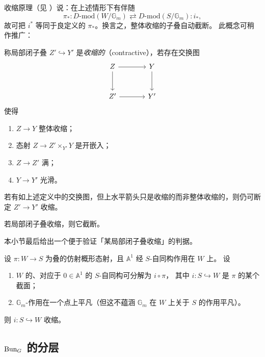 收缩原理（见 \cite[命题 5.3.2]{DG15}）说：在上述情形下有伴随
\[
\pi_*\colon D\text{-}\mathrm{mod}(W/\mathbb{G}_m)\rightleftarrows D\text{-}\mathrm{mod}(S/\mathbb{G}_m):i_*,
\]
故可把 $i^{*}$ 等同于良定义的 $\pi_*$。换言之，整体收缩的子叠自动截断。
此概念可稍作推广：

\begin{definition}[{[DG15, 5.2.1]}]
\label{def:contractive}
称局部闭子叠 $Z'\hookrightarrow Y'$ 是\emph{收缩的}（contractive），若存在交换图
\[
\begin{tikzcd}[column sep=large,row sep=large]
Z \arrow[r] \arrow[d] & Y \arrow[d]\\
Z' \arrow[r] & Y'
\end{tikzcd}
\]
使得
\begin{enumerate}
\item[(i)] $Z\to Y$ 整体收缩；
\item[(ii)] 态射 $Z\to Z'\times_{Y'}Y$ 是开嵌入；
\item[(iii)] $Z\to Z'$ 满；
\item[(iv)] $Y\to Y'$ 光滑。
\end{enumerate}
\end{definition}
若有如上述定义中的交换图，但上水平箭头只是收缩的而非整体收缩的，则仍可断定
$Z'\to Y'$ 收缩。

\begin{proposition}[{[DG15, 推论 5.2.3]}]
\label{prop:contractive-truncative}
若局部闭子叠收缩，则它截断。
\end{proposition}

本小节最后给出一个便于验证「某局部闭子叠收缩」的判据。

\begin{proposition}[{[DG15, 引理 5.4.3]}]
\label{prop:contractive-criterion}
设 $\pi\colon W\to S$ 为叠的仿射概形态射，且 $\mathbb{A}^1$ 经 $S$-自同构作用在 $W$ 上。
设
\begin{enumerate}
\item[(i)] $W$ 的、对应于 $0\in\mathbb{A}^1$ 的 $S$-自同构可分解为 $i\circ \pi$，
其中 $i\colon S\hookrightarrow W$ 是 $\pi$ 的某个截面；
\item[(ii)] $\mathbb{G}_m$-作用在一个点上平凡（但这不蕴涵 $\mathbb{G}_m$ 在 $W$ 上关于 $S$ 的作用平凡）。
\end{enumerate}
则 $i\colon S\hookrightarrow W$ 收缩。
\end{proposition}

\subsection{\texorpdfstring{$\mathrm{Bun}_G$ 的分层}{G 的分层}}
\label{sec:hn}

